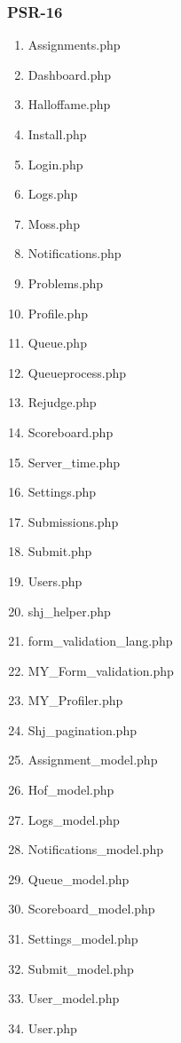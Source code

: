 \subsubsection{PSR-16}
\begin{enumerate}
	\item Assignments.php
	\item Dashboard.php
	\item Halloffame.php
	\item Install.php
	\item Login.php
	\item Logs.php
	\item Moss.php
	\item Notifications.php
	\item Problems.php
	\item Profile.php
	\item Queue.php
	\item Queueprocess.php
	\item Rejudge.php
	\item Scoreboard.php
	\item Server\_time.php
	\item Settings.php
	\item Submissions.php
	\item Submit.php
	\item Users.php
	\item shj\_helper.php
	\item form\_validation\_lang.php
	\item MY\_Form\_validation.php
	\item MY\_Profiler.php
	\item Shj\_pagination.php
	\item Assignment\_model.php
	\item Hof\_model.php
	\item Logs\_model.php
	\item Notifications\_model.php
	\item Queue\_model.php
	\item Scoreboard\_model.php
	\item Settings\_model.php
	\item Submit\_model.php
	\item User\_model.php
	\item User.php
\end{enumerate}


